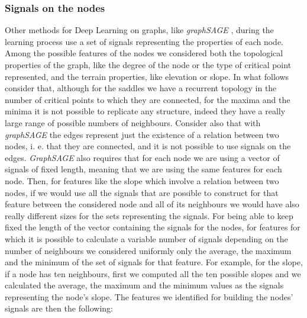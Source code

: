 \subsubsection{Signals on the nodes}
Other methods for Deep Learning on graphs, like \textit{graphSAGE} \cite{graphSAGE}, during the learning process use a set of signals representing the properties of each node. Among the possible features of the nodes we considered both the topological properties of the graph, like the degree of the node or the type of critical point represented, and the terrain properties, like elevation or slope. In what follows consider that, although for the saddles we have a recurrent topology in the number of critical points to which they are connected, for the maxima and the minima it is not possible to replicate any structure, indeed they have a really large range of possible numbers of neighbours. Consider also that with \textit{graphSAGE} the edges represent just the existence of a relation between two nodes, i. e. that they are connected, and it is not possible to use signals on the edges. \textit{GraphSAGE} also requires that for each node we are using a vector of signals of fixed length, meaning that we are using the same features for each node. Then, for features like the slope which involve a relation between two nodes, if we would use all the signals that are possible to construct for that feature between the considered node and all of its neighbours we would have also really different sizes for the sets representing the signals. For being able to keep fixed the length of the vector containing the signals for the nodes, for features for which it is possible to calculate a variable number of signals depending on the number of neighbours we considered uniformly only the average, the maximum and the minimum of the set of signals for that feature. For example, for the slope, if a node has ten neighbours, first we computed all the ten possible slopes and we calculated the average, the maximum and the minimum values as the signals representing the node's slope. The features we identified for building the nodes' signals are then the following:
